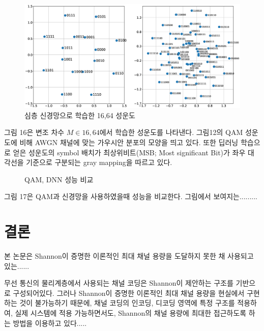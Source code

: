 \documentclass[11pt]{oblivoir}
\begin{document}
\begin{figure}[h!]
    \centering
    \includegraphics[width=1.\columnwidth]{figure/DNNconstellations.eps}
    \caption{심층 신경망으로 학습한 16,64 성운도}
    \label{fig:my_label}
\end{figure}

그림 16은 변조 차수 $M \in {16,64}$에서 학습한 성운도를 나타낸다. 그림12의 QAM 성운도에 비해 AWGN 채널에 맞는 가우시안 분포의 모양을 띄고 있다. 또한 딥러닝 학습으로 얻은 성운도의 symbol 배치가  최상위비트(MSB; Most significant Bit)가 좌우 대각선을 기준으로 구분되는 gray mapping을 따르고 있다.

\begin{figure}[h!]
    \centering
    \DrawError
    \caption{QAM, DNN 성능 비교}
    \label{fig:my_label}
\end{figure}

그림 17은 QAM과 신경망을 사용하였을때 성능을 비교한다. 그림에서 보여지는.........

\newpage


\section{\centering 결론}

본 논문은 Shannon이 증명한 이론적인 최대 채널 용량을 도달하지 못한 채 사용되고 있는......

 

\clearpage
\cedp

\newpage

\makeabstractKor %

무선 통신의 물리계층에서 사용되는 채널 코딩은 Shannon이 제안하는 구조를 기반으로 구성되어있다. 그러나 Shannon이 증명한 이론적인 최대 채널 용량을 현실에서 구현하는 것이 불가능하기 때문에, 채널 코딩의 인코딩, 디코딩 영역에 특정 구조를 적용하여, 실제 시스템에 적용 가능하면서도, Shannon의 채널 용량에 최대한 접근하도록 하는 방법을 이용하고 있다.....
\end{document}
